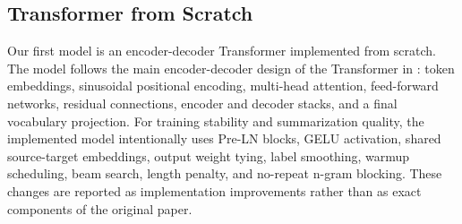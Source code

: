 \documentclass[conference]{IEEEtran}
\begin{document}
\subsection{Transformer from Scratch}
Our first model is an encoder-decoder Transformer implemented from scratch. The model follows the main encoder-decoder design of the Transformer in \cite{vaswani2017attention}: token embeddings, sinusoidal positional encoding, multi-head attention, feed-forward networks, residual connections, encoder and decoder stacks, and a final vocabulary projection. For training stability and summarization quality, the implemented model intentionally uses Pre-LN blocks, GELU activation, shared source-target embeddings, output weight tying, label smoothing, warmup scheduling, beam search, length penalty, and no-repeat n-gram blocking. These changes are reported as implementation improvements rather than as exact components of the original paper.
\end{document}
